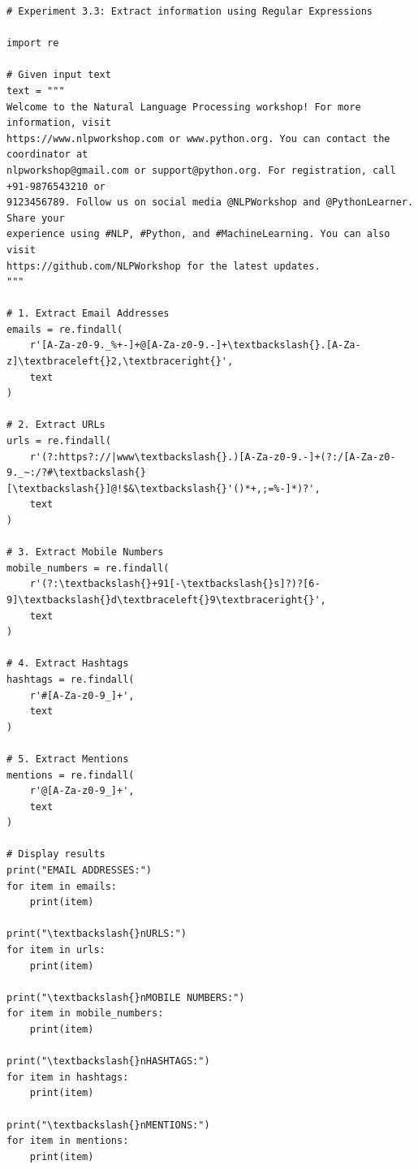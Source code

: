 \documentclass[12pt,a4paper,oneside]{report}
\begin{document}
\begin{Verbatim}[commandchars=\\\{\},breaklines=true,breakanywhere=true,fontsize=\scriptsize,frame=leftline,framesep=2mm,rulecolor=\color{gray}]
# Experiment 3.3: Extract information using Regular Expressions

import re

# Given input text
text = """
Welcome to the Natural Language Processing workshop! For more information, visit
https://www.nlpworkshop.com or www.python.org. You can contact the coordinator at
nlpworkshop@gmail.com or support@python.org. For registration, call +91-9876543210 or
9123456789. Follow us on social media @NLPWorkshop and @PythonLearner. Share your
experience using #NLP, #Python, and #MachineLearning. You can also visit
https://github.com/NLPWorkshop for the latest updates.
"""

# 1. Extract Email Addresses
emails = re.findall(
    r'[A-Za-z0-9._%+-]+@[A-Za-z0-9.-]+\textbackslash{}.[A-Za-z]\textbraceleft{}2,\textbraceright{}',
    text
)

# 2. Extract URLs
urls = re.findall(
    r'(?:https?://|www\textbackslash{}.)[A-Za-z0-9.-]+(?:/[A-Za-z0-9._~:/?#\textbackslash{}[\textbackslash{}]@!$&\textbackslash{}'()*+,;=%-]*)?',
    text
)

# 3. Extract Mobile Numbers
mobile_numbers = re.findall(
    r'(?:\textbackslash{}+91[-\textbackslash{}s]?)?[6-9]\textbackslash{}d\textbraceleft{}9\textbraceright{}',
    text
)

# 4. Extract Hashtags
hashtags = re.findall(
    r'#[A-Za-z0-9_]+',
    text
)

# 5. Extract Mentions
mentions = re.findall(
    r'@[A-Za-z0-9_]+',
    text
)

# Display results
print("EMAIL ADDRESSES:")
for item in emails:
    print(item)

print("\textbackslash{}nURLS:")
for item in urls:
    print(item)

print("\textbackslash{}nMOBILE NUMBERS:")
for item in mobile_numbers:
    print(item)

print("\textbackslash{}nHASHTAGS:")
for item in hashtags:
    print(item)

print("\textbackslash{}nMENTIONS:")
for item in mentions:
    print(item)
\end{Verbatim}
\end{document}
